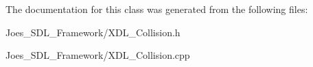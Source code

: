 The documentation for this class was generated from the following files\-:\begin{DoxyCompactItemize}
\item 
Joes\-\_\-\-S\-D\-L\-\_\-\-Framework/X\-D\-L\-\_\-\-Collision.\-h\item 
Joes\-\_\-\-S\-D\-L\-\_\-\-Framework/X\-D\-L\-\_\-\-Collision.\-cpp\end{DoxyCompactItemize}
